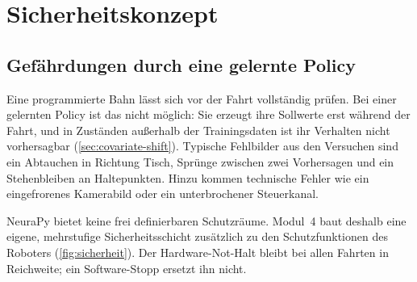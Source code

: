 \chapter{Sicherheitskonzept}
\label{ch:sicherheit}

\section{Gefährdungen durch eine gelernte Policy}
\label{sec:gefahren}

Eine programmierte Bahn lässt sich vor der Fahrt vollständig prüfen. Bei einer gelernten
Policy ist das nicht möglich: Sie erzeugt ihre Sollwerte erst während der Fahrt, und in
Zuständen außerhalb der Trainingsdaten ist ihr Verhalten nicht vorhersagbar
(\cref{sec:covariate-shift}). Typische Fehlbilder aus den Versuchen sind ein Abtauchen in
Richtung Tisch, Sprünge zwischen zwei Vorhersagen und ein Stehenbleiben an Haltepunkten.
Hinzu kommen technische Fehler wie ein eingefrorenes Kamerabild oder ein unterbrochener
Steuerkanal.

NeuraPy bietet keine frei definierbaren Schutzräume. Modul~4 baut deshalb eine eigene,
mehrstufige Sicherheitsschicht zusätzlich zu den Schutzfunktionen des Roboters
(\cref{fig:sicherheit}). Der Hardware-Not-Halt bleibt bei allen Fahrten in Reichweite; ein
Software-Stopp ersetzt ihn nicht.


